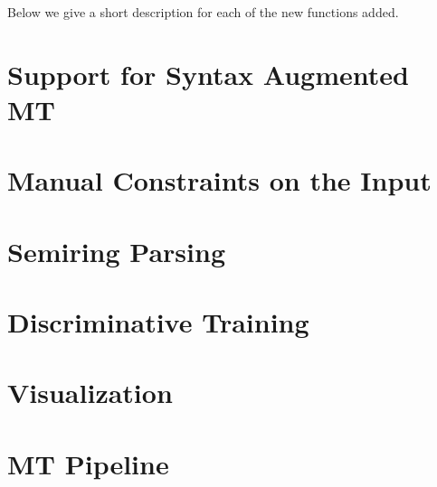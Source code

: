 \documentclass[11pt]{article}
\begin{document}
Below we give a short description for each of the new functions added.


\section{Support for Syntax Augmented MT}


\section{Manual Constraints on the Input}

\section{Semiring Parsing}

\cite{li-eisner:2009:EMNLP}

\section{Discriminative Training}

\cite{variational-decoding-acl09}
\cite{oracle-extraction-naacl09}

\section{Visualization}

\section{MT Pipeline}



\end{document}
